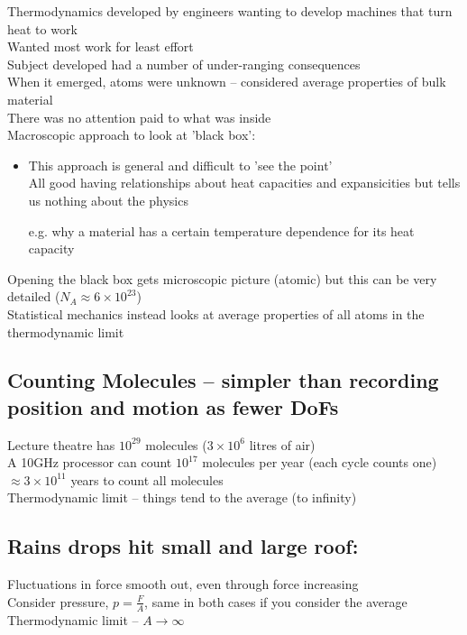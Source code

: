 \documentclass[a4paper, 11pt, normalem]{report}
\begin{document}
Thermodynamics developed by engineers wanting to develop machines that turn heat to work \\
Wanted most work for least effort \\
Subject developed had a number of under-ranging consequences \\
When it emerged, atoms were unknown -- considered average properties of bulk material \\
There was no attention paid to what was inside \\
Macroscopic approach to look at 'black box':
\begin{itemize}
  \item This approach is general and difficult to 'see the point' \\
  All good having relationships about heat capacities and expansicities but tells us nothing about the physics
  \item[e.g.] why a material has a certain temperature dependence for its heat capacity
\end{itemize}

Opening the black box gets microscopic picture (atomic) but this can be very detailed ($N_A \approx 6 \times 10^23$) \\
Statistical mechanics instead looks at average properties of all atoms in the thermodynamic limit

\subsection{Counting Molecules -- simpler than recording position and motion  as fewer DoFs}
Lecture theatre has $10^{29}$ molecules ($3 \times 10^6$ litres of air) \\
A 10GHz processor can count $10^17$ molecules per year (each cycle counts one) $\approx 3 \times 10^11$ years to count all molecules \\
Thermodynamic limit -- things tend to the average (to infinity)

\subsection{Rains drops hit small and large roof:}
Fluctuations in force smooth out, even through force increasing \\
Consider pressure, $p = \frac{F}{A}$, same in both cases if you consider the average \\
Thermodynamic limit -- $A \to \infty$
\end{document}
